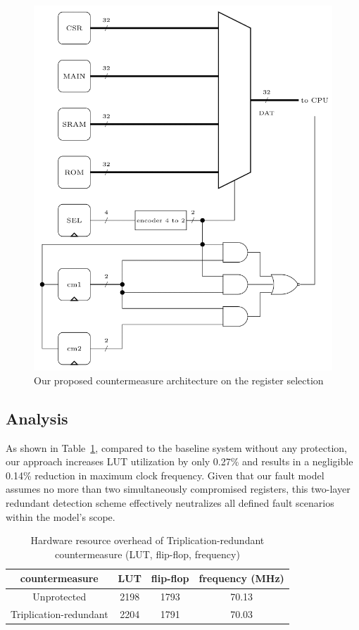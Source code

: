 \begin{figure}[t!]
  \centering
  \includegraphics[width=0.9\linewidth]{Chapitre4/figures/cm tri.png}
  \caption{Our proposed countermeasure architecture on the register selection}
  \label{proposed cm}
\end{figure}

\subsection{Analysis}
 As shown in Table~\ref{tab:triplication synthesis}, compared to the baseline system without any protection, our approach increases LUT utilization by only 0.27\% and results in a negligible 0.14\% reduction in maximum clock frequency. Given that our fault model assumes no more than two simultaneously compromised registers, this two-layer redundant detection scheme effectively neutralizes all defined fault scenarios within the model's scope.

\begin{table}
    \centering
  \caption{Hardware resource overhead of Triplication-redundant countermeasure (LUT, flip-flop, frequency)}
  \label{tab:triplication synthesis}
\begin{tabular}{cccc}
\hline
countermeasure & LUT & flip-flop & frequency (MHz) \\
\hline
Unprotected & 2198 & 1793 & 70.13 \\
Triplication-redundant & 2204 & 1791 & 70.03 \\
\hline
\end{tabular}
\end{table}


